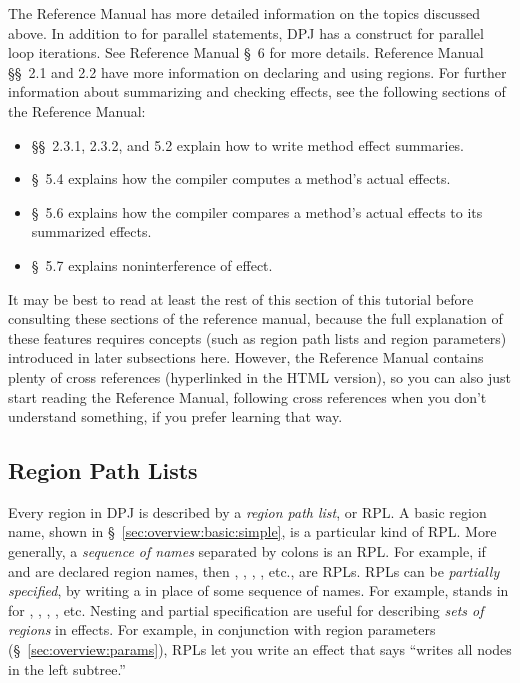 The Reference Manual has more detailed information on the topics
discussed above.  In addition to  for parallel
statements, DPJ has a  construct for parallel loop
iterations.  See Reference Manual \S~6 for more details.  Reference
Manual \S\S~2.1 and 2.2 have more information on declaring and using
regions.  For further information about summarizing and checking
effects, see the following sections of the Reference Manual:
%
\begin{itemize}
%
\item 
\S\S~2.3.1, 2.3.2, and 5.2 explain how to write method effect summaries.
%
\item
\S~5.4 explains how the compiler computes a method's actual effects.
%
\item
\S~5.6 explains how the compiler compares a method's actual effects to
its summarized effects.
%
\item
\S~5.7 explains noninterference of effect.
\end{itemize}
%
It may be best to read at least the rest of this section of this
tutorial before consulting these sections of the reference manual,
because the full explanation of these features requires concepts (such
as region path lists and region parameters) introduced in later
subsections here.  However, the Reference Manual contains plenty of
cross references (hyperlinked in the HTML version), so you can also
just start reading the Reference Manual, following cross references
when you don't understand something, if you prefer learning that way.

\subsection{Region Path Lists%
\label{sec:overview:rpls}}

Every region in DPJ is described by a \emph{region path list}, or RPL.
A basic region name, shown in \S~\ref{sec:overview:basic:simple}, is a
particular kind of RPL.  More generally, a \emph{sequence of names}
separated by colons is an RPL.  For example, if  and 
are declared region names, then , , ,
, etc., are RPLs.  RPLs can be \emph{partially specified},
by writing a \kwd{*} in place of some sequence of names.  For example,
 stands in for , , ,
, etc.  Nesting and partial specification are useful for
describing \emph{sets of regions} in effects.  For example, in
conjunction with region parameters (\S~\ref{sec:overview:params}),
RPLs let you write an effect that says ``writes all nodes in the left
subtree.''

